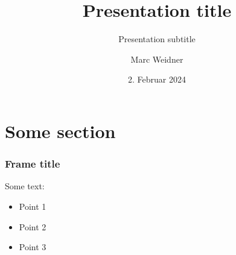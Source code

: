 \documentclass[10pt]{beamer}
\title{Presentation title}
\subtitle{Presentation subtitle}
\author[M. Weidner]{Marc Weidner}
\date[02.02.2024]{2. Februar 2024}
\begin{document}
\titleframe

\tocframe[hideallsubsections]


\section{Some section}

\begin{frame}
\frametitle{Frame title}
Some text:
\begin{itemize}
\item Point 1
\item Point 2
\item Point 3
\end{itemize}
\end{frame}


\signatureframe
\end{document}

